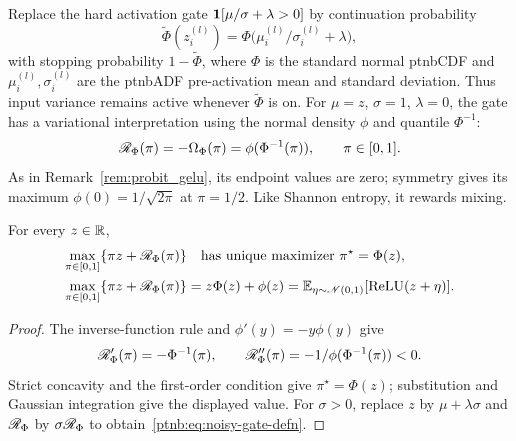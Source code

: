 Replace the hard activation gate $\mathbf{1}[\mu/\sigma+\lambda>0]$ by continuation probability
\begin{equation}\label{ptnb:eq:noisy-gate-defn}
    \tilde\Phi(z_i^{(l)})=\Phi\bigl(\mu_i^{(l)}/\sigma_i^{(l)}+\lambda\bigr),
\end{equation}
with stopping probability $1-\tilde\Phi$, where $\Phi$ is the standard normal \ac{ptnbCDF} and
$\mu_i^{(l)},\sigma_i^{(l)}$ are the \ac{ptnbADF} pre-activation mean and standard deviation.
Thus input variance remains active whenever $\tilde\Phi$ is on. For $\mu=z$, $\sigma=1$,
$\lambda=0$, the gate has a variational interpretation using the normal density $\phi$ and quantile
$\Phi^{-1}$:
\begin{equation}\label{ptnb:eq:noisy-gate-regulariser}
    \mathscr{R}_\Phi(\pi)=-\Omega_\Phi(\pi)=\phi(\Phi^{-1}(\pi)),\qquad \pi\in[0,1].
\end{equation}
As in Remark~\ref{rem:probit_gelu}, its endpoint values are zero; symmetry gives its maximum $\phi(0)=1/\sqrt{2\pi}$ at $\pi=1/2$.
Like Shannon entropy, it rewards mixing.

\begin{lemmaenv}\label{ptnb:lem:noisy-gate-dual}
For every $z\in\mathbb{R}$,
\begin{align}
    \max_{\pi\in[0,1]}\{\pi z+\mathscr{R}_\Phi(\pi)\}
        &\quad\text{has unique maximizer }\pi^\star=\Phi(z),\label{ptnb:eq:noisy-gate-objective}\\
    \max_{\pi\in[0,1]}\{\pi z+\mathscr{R}_\Phi(\pi)\}
        &=z\Phi(z)+\phi(z)=\mathbb{E}_{\eta\sim\mathscr N(0,1)}[\text{ReLU}(z+\eta)].\label{ptnb:eq:noisy-gate-optimum}
\end{align}
\end{lemmaenv}
\begin{proof}
The inverse-function rule and $\phi'(y)=-y\phi(y)$ give
\begin{equation}\label{ptnb:eq:noisy-gate-deriv}
    \mathscr{R}_\Phi'(\pi)=-\Phi^{-1}(\pi),\qquad
    \mathscr{R}_\Phi''(\pi)=-1/\phi(\Phi^{-1}(\pi))<0.
\end{equation}
Strict concavity and the first-order condition give $\pi^\star=\Phi(z)$; substitution and Gaussian
integration give the displayed value. For $\sigma>0$, replace $z$ by $\mu+\lambda\sigma$ and
$\mathscr{R}_\Phi$ by $\sigma\mathscr{R}_\Phi$ to obtain~\eqref{ptnb:eq:noisy-gate-defn}.
\end{proof}

